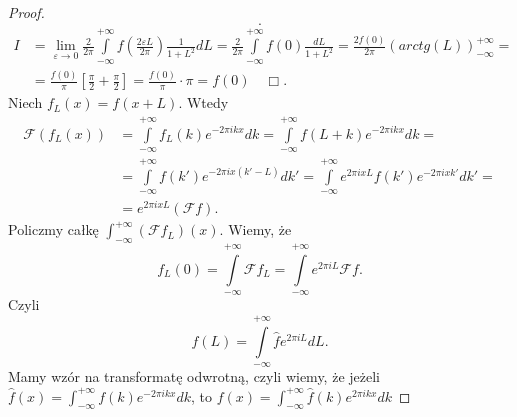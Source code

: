\documentclass[../main.tex]{subfiles}
\begin{document}
\begin{proof}
\[.\]
\begin{align*}
    I &= \lim_{\varepsilon \to 0}\frac{2}{2\pi }\int\limits_{-\infty}^{+\infty}f\left( \frac{2\varepsilon L}{2\pi } \right) \frac{1}{1 + L^2}dL = \frac{2}{2\pi}\int\limits_{-\infty}^{+\infty}f(0)\frac{dL}{1+L^2} = \frac{2 f(0)}{2\pi }\left( arctg(L)\right)_{-\infty}^{+\infty} =\\
    &= \frac{f(0)}{\pi} \left[ \frac{\pi}{2} + \frac{\pi}{2} \right] = \frac{f(0)}{\pi} \cdot \pi = f(0)\quad \Box
.\end{align*}
Niech $f_L(x) = f(x+L)$. Wtedy
\begin{align*}
    \mathcal{F}\left( f_L(x) \right) &= \int\limits_{-\infty}^{+\infty}f_L(k) e^{-2\pi i k x}dk = \int\limits_{-\infty}^{+\infty}f(L+k)e^{-2\pi ikx}dk =\\
    &= \int\limits_{-\infty}^{+\infty}f(k') e^{-2\pi i x(k' - L)}dk' = \int\limits_{-\infty}^{+\infty}e^{2\pi ix L}f(k')e^{-2\pi ixk'}dk' =\\
    &= e^{2\pi ixL}\left( \mathcal{F}f \right)
.\end{align*}
Policzmy całkę $\int_{-\infty}^{+\infty}(\mathcal{F}f_L)(x)$. Wiemy, że
\[
    f_L(0) = \int\limits_{-\infty}^{+\infty}\mathcal{F}f_L = \int\limits_{-\infty}^{+\infty}e^{2\pi i L}\mathcal{F}f
.\]
Czyli
\[
    f(L) = \int\limits_{-\infty}^{+\infty}\hat{f}e^{2\pi i L}dL
.\]
Mamy wzór na transformatę odwrotną, czyli wiemy, że jeżeli $\hat{f}(x) = \int_{-\infty}^{+\infty}f(k)e^{-2\pi i kx}dk$, to $f(x) = \int_{-\infty}^{+\infty}\hat{f}(k) e^{2\pi i kx}dk$
\end{proof}
\end{document}
